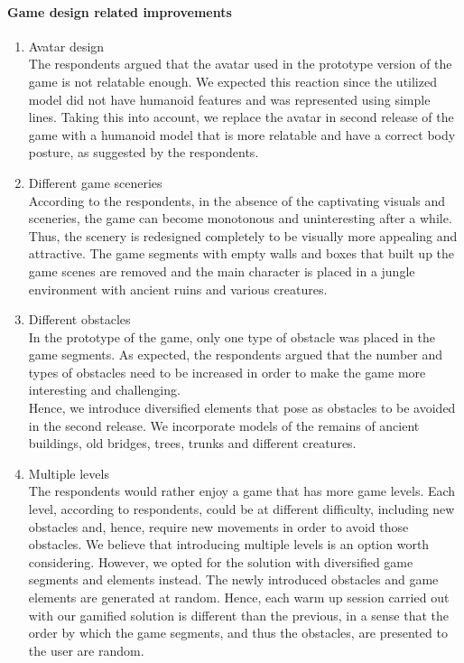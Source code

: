 \paragraph{Game design related improvements}
	\begin{enumerate}
		\item Avatar design\\
The respondents argued that the avatar used in the prototype version of the game is not relatable enough. We expected this reaction since the utilized model did not have humanoid features and was represented using simple lines. Taking this into account, we replace the avatar in second release of the game with a humanoid model that is more relatable and have a correct body posture, as suggested by the respondents.
\item Different game sceneries\\ 
According to the respondents, in the absence of the captivating visuals and sceneries, the game can become monotonous and uninteresting after a while. Thus, the scenery is redesigned completely to be visually more appealing and attractive. The game segments with empty walls and boxes that built up the game scenes are removed and the main character is placed in a jungle environment with ancient ruins and various creatures. 
\item Different obstacles\\
In the prototype of the game, only one type of obstacle was placed in the game segments.  As expected, the respondents argued that the number and types of obstacles need to be increased in order to make the game more interesting and challenging. \\Hence, we introduce diversified elements that pose as obstacles to be avoided in the second release. We incorporate models of the remains of ancient buildings, old bridges, trees, trunks and different creatures.  
\item Multiple levels\\
The respondents would rather enjoy a game that has more game levels. Each level, according to respondents, could be at different difficulty, including new obstacles and, hence, require new movements in order to avoid those obstacles. We believe that introducing multiple levels is an option worth considering. However, we opted for the solution with diversified game segments and elements instead. The newly introduced obstacles and game elements are generated at random. Hence, each warm up session carried out with our gamified solution is different than the previous, in a sense that the order by which the game segments, and thus the obstacles, are presented to the user are random.  

\end{enumerate}
